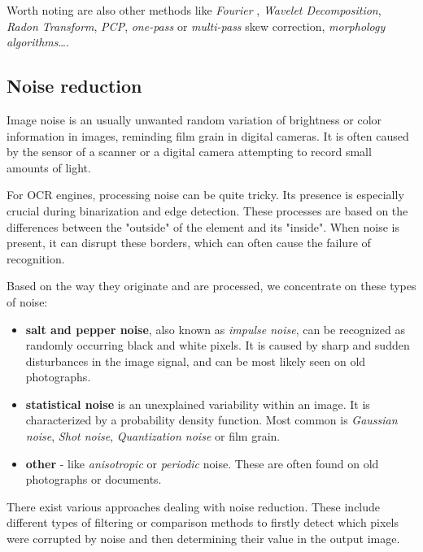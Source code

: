 Worth noting are also other methods like \emph{Fourier} \citep{fourierTransform}, \emph{Wavelet Decomposition}, \emph{Radon Transform}, \emph{PCP}, \emph{one-pass} or \emph{multi-pass} skew correction, \emph{morphology algorithms}\ldots \citep{skewBestTechniques}.

\subsection{Noise reduction}

Image noise is an usually unwanted random variation of brightness or color information in images, reminding film grain in digital cameras. It is often caused by the sensor of a scanner or a digital camera attempting to record small amounts of light. 

For OCR engines, processing noise can be quite tricky. Its presence is especially crucial during binarization and edge detection. These processes are based on the differences between the "outside" of the element and its "inside". When noise is present, it can disrupt these borders, which can often cause the failure of recognition.

Based on the way they originate and are processed, we concentrate on these types of noise:

\begin{itemize}
\item\textbf{salt and pepper noise}, also known as \emph{impulse noise}, can be recognized as randomly occurring black and white pixels. It is caused by sharp and sudden disturbances in the image signal, and can be most likely seen on old photographs.

\item\textbf{statistical noise\xxx{ - }} is an unexplained variability within an image. It is characterized by a probability density function. Most common is \emph{Gaussian noise}, \emph{Shot noise}, \emph{Quantization noise} or film grain.

\item\textbf{other} - like \emph{anisotropic} or \emph{periodic} noise. These are often found on old photographs or documents.

\end{itemize}

There exist various approaches dealing with noise reduction. These include different types of filtering or comparison methods to firstly detect which pixels were corrupted by noise and then determining their value in the output image.


